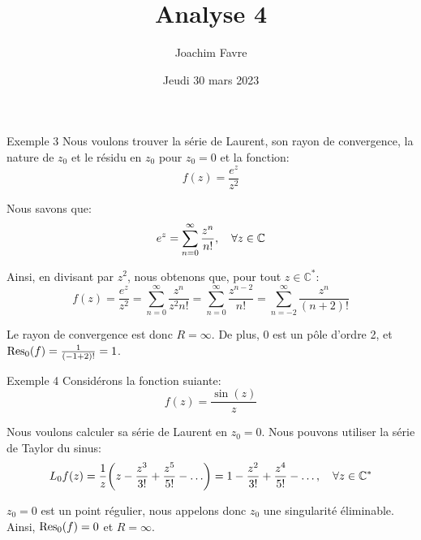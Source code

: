 \documentclass[a4paper]{article}
\title{Analyse 4}
\author{Joachim Favre}
\date{Jeudi 30 mars 2023}
\begin{document}
\maketitle


\begin{parag}{Exemple 3}
    Nous voulons trouver la série de Laurent, son rayon de convergence, la nature de $z_0$ et le résidu en $z_0$ pour $z_0 = 0$ et la fonction: 
    \[f\left(z\right) = \frac{e^{z}}{z^2}\]
    
    Nous savons que: 
    \[e^z = \sum_{n=0}^{\infty} \frac{z^n}{n!}, \quad \forall z \in\mathbb{C}\]
    
    Ainsi, en divisant par $z^2$, nous obtenons que, pour tout $z \in \mathbb{C}^*$: 
    \[f\left(z\right) = \frac{e^z}{z^2} = \sum_{n=0}^{\infty} \frac{z^n}{z^2 n!} = \sum_{n=0}^{\infty} \frac{z^{n-2}}{n!} = \sum_{n=-2}^{\infty} \frac{z^n}{\left(n+2\right)!}\]

    Le rayon de convergence est donc $R = \infty$. De plus, $0$ est un pôle d'ordre 2, et $\Res_0\left(f\right) = \frac{1}{\left(-1+2\right)!} = 1$.
\end{parag}

\begin{parag}{Exemple 4}
    Considérons la fonction suiante: 
    \[f\left(z\right) = \frac{\sin\left(z\right)}{z}\]
    
    Nous voulons calculer sa série de Laurent en $z_0 = 0$. Nous pouvons utiliser la série de Taylor du sinus: 
    \[L_0 f\left(z\right) = \frac{1}{z} \left(z - \frac{z^3}{3!} + \frac{z^5}{5!} - \ldots\right) = 1 - \frac{z^2}{3!} + \frac{z^4}{5!} - \ldots, \mathspace \forall z \in \mathbb{C}^*\]
    
    $z_0 = 0$ est un point régulier, nous appelons donc $z_0$ une singularité éliminable. Ainsi, $\Res_0\left(f\right) = 0$ et $R = \infty$.
\end{parag}
\end{document}
